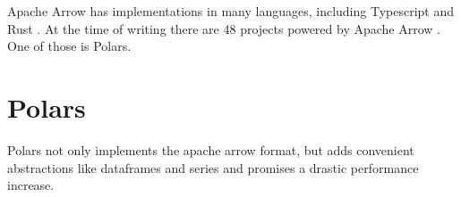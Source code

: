 Apache Arrow has implementations in many languages, including Typescript and Rust \autocite{arrow:status}.
At the time of writing there are 48 projects powered by Apache Arrow \autocite{arrow:projects}.
One of those is Polars.



\section{Polars}
\label{section:polars}
Polars not only implements the apache arrow format, but adds convenient abstractions like dataframes and series and promises a drastic performance increase.


